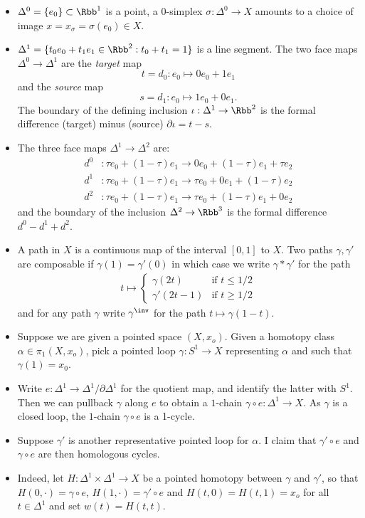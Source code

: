 \begin{itemize}
  \item $\Delta^0 = \{e_0\} \subset \Rbb^1$ is a point, a $0$-simplex $\sigma: \Delta^0 \to X$ amounts to a choice of image $x=x_\sigma=\sigma(e_0) \in X$.
  \item $\Delta^1 = \{ t_0 e_0+t_1 e_1 \in \Rbb^2: t_0 + t_1 = 1\}$ is a line segment. The two face maps $\Delta^0 \to \Delta^1$ are the \emph{target} map \[t=d_0: e_0 \mapsto 0e_0+1e_1\] and the \emph{source} map \[s=d_1: e_0 \mapsto 1 e_0 +0 e_1.\] The boundary of the defining inclusion $\iota:\Delta^1 \to \Rbb^2$ is the formal difference (target) minus (source) $\partial \iota =t-s $.
  \item The three face maps $\Delta^1 \to \Delta^2$ are:
        \begin{align*}
          d^0 & : \tau e_0 + (1-\tau) e_1 \to 0 e_0 + (1-\tau) e_1 + \tau e_2 \\
          d^1 & : \tau e_0 + (1-\tau) e_1 \to \tau e_0 + 0 e_1 + (1-\tau)e_2  \\
          d^2 & : \tau e_0 + (1-\tau) e_1 \to \tau e_0 + (1-\tau) e_1 + 0e_2
        \end{align*}
        and the boundary of the inclusion $\Delta^2 \to \Rbb^3$ is the formal difference $d^0-d^1+d^2$.
  \item A path in $X$ is a continuous map of the interval $[0,1]$ to $X$. Two paths $\gamma,\gamma'$ are composable if $\gamma(1)=\gamma'(0)$ in which case we write $\gamma*\gamma'$ for the path
        \begin{align*}
          t \mapsto
          \begin{cases}
            \gamma(2t)    & \text{if }t\leq 1/2  \\ %
            \gamma'(2t-1) & \text{if }t \geq 1/2 %
          \end{cases}
        \end{align*}
        and for any path $\gamma$ write $\gamma^\inv$ for the path $t \mapsto \gamma(1-t)$.
  \item Suppose we are given a pointed space $(X,x_o)$. Given a homotopy class $\alpha \in \pi_1(X,x_o)$, pick a pointed loop $\gamma : S^1 \to X$  representing $\alpha$ and such that $\gamma(1)=x_0$.
  \item Write $e: \Delta^1 \to \Delta^1/\partial \Delta^1$ for the quotient map, and identify the latter with $S^1$. Then we can pullback $\gamma$ along $e$ to obtain a $1$-chain $\gamma \circ e : \Delta^1 \to X$. As $\gamma$ is a closed loop, the $1$-chain $\gamma \circ e$ is a 1-cycle.
  \item Suppose $\gamma'$ is another representative pointed loop for $\alpha$. I claim that $\gamma'\circ e$ and $\gamma \circ e$ are then homologous cycles.
  \item Indeed, let $H: \Delta^1 \times \Delta^1 \to X$ be a pointed homotopy between $\gamma$ and $\gamma'$, so that $H(0,\cdot)=\gamma \circ e$, $H(1,\cdot )= \gamma'\circ e$ and $H(t,0)=H(t,1) = x_o$ for all $t\in \Delta^1$ and set $w(t)=H(t,t)$.
\end{itemize}
